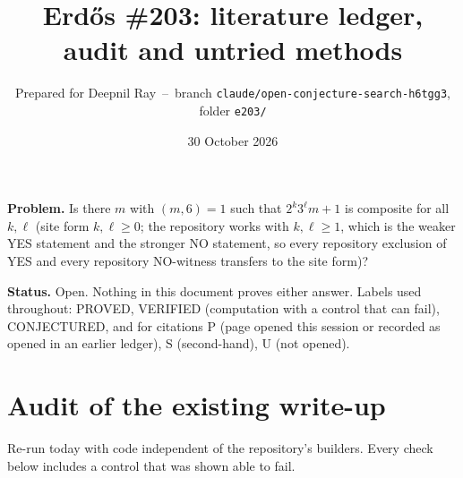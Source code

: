 \documentclass[11pt,a4paper]{article}
\title{Erd\H{o}s \#203: literature ledger, audit and untried methods}
\author{Prepared for Deepnil Ray \,--\, branch \texttt{claude/open-conjecture-search-h6tgg3}, folder \texttt{e203/}}
\date{30 October 2026}
\begin{document}
\maketitle

\textbf{Problem.} Is there $m$ with $(m,6)=1$ such that $2^k3^\ell m+1$ is composite for all $k,\ell$ (site form $k,\ell\ge0$; the repository works with $k,\ell\ge1$, which is the weaker YES statement and the stronger NO statement, so every repository exclusion of YES and every repository NO-witness transfers to the site form)?

\textbf{Status.} Open. Nothing in this document proves either answer. Labels used throughout: PROVED, VERIFIED (computation with a control that can fail), CONJECTURED, and for citations P (page opened this session or recorded as opened in an earlier ledger), S (second-hand), U (not opened).

\section{Audit of the existing write-up}

Re-run today with code independent of the repository's builders. Every check below includes a control that was shown able to fail.
\end{document}
